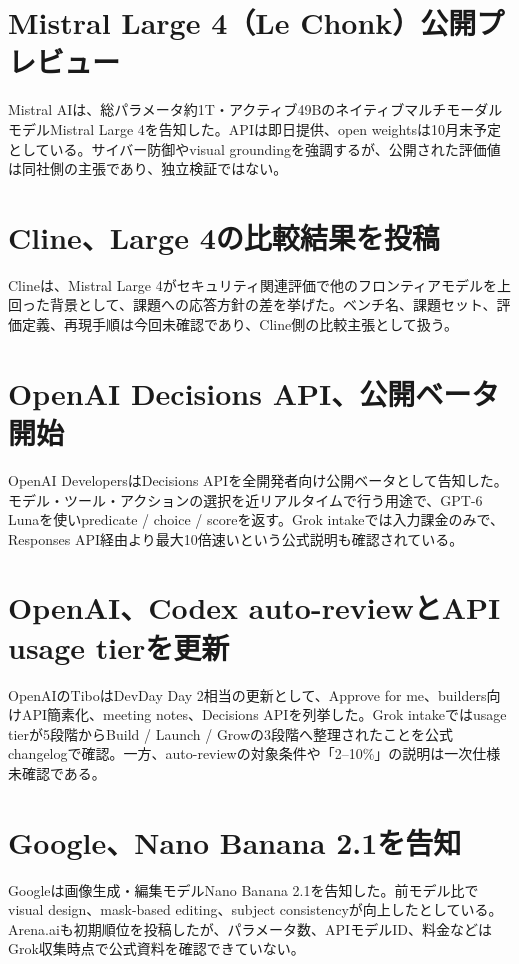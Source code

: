 \section{Mistral Large 4（Le Chonk）公開プレビュー}
Mistral AIは、総パラメータ約1T・アクティブ49BのネイティブマルチモーダルモデルMistral Large 4を告知した。APIは即日提供、open weightsは10月末予定としている。サイバー防御やvisual groundingを強調するが、公開された評価値は同社側の主張であり、独立検証ではない。

\section{Cline、Large 4の比較結果を投稿}
Clineは、Mistral Large 4がセキュリティ関連評価で他のフロンティアモデルを上回った背景として、課題への応答方針の差を挙げた。ベンチ名、課題セット、評価定義、再現手順は今回未確認であり、Cline側の比較主張として扱う。

\section{OpenAI Decisions API、公開ベータ開始}
OpenAI DevelopersはDecisions APIを全開発者向け公開ベータとして告知した。モデル・ツール・アクションの選択を近リアルタイムで行う用途で、GPT-6 Lunaを使いpredicate / choice / scoreを返す。Grok intakeでは入力課金のみで、Responses API経由より最大10倍速いという公式説明も確認されている。

\section{OpenAI、Codex auto-reviewとAPI usage tierを更新}
OpenAIのTiboはDevDay Day 2相当の更新として、Approve for me、builders向けAPI簡素化、meeting notes、Decisions APIを列挙した。Grok intakeではusage tierが5段階からBuild / Launch / Growの3段階へ整理されたことを公式changelogで確認。一方、auto-reviewの対象条件や「2--10\%」の説明は一次仕様未確認である。

\section{Google、Nano Banana 2.1を告知}
Googleは画像生成・編集モデルNano Banana 2.1を告知した。前モデル比でvisual design、mask-based editing、subject consistencyが向上したとしている。Arena.aiも初期順位を投稿したが、パラメータ数、APIモデルID、料金などはGrok収集時点で公式資料を確認できていない。

